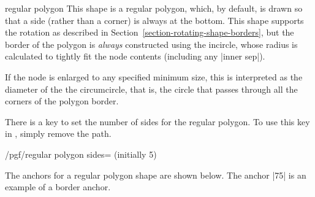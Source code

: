 \begin{shape}{regular polygon}
  This shape is a regular polygon, which, by default, is drawn so that 
  a side (rather than a corner) is always at the bottom. 
  This shape supports the rotation as described in 
  Section~\ref{section-rotating-shape-borders}, but the border of the 
  polygon is \emph{always} constructed using the incircle, whose
  radius is calculated to tightly fit the node contents (including
  any |inner sep|).
  
\begin{codeexample}[]
\end{codeexample}	
	
  If the node is enlarged to any specified minimum size, 
  this is interpreted as the diameter of the the 
  circumcircle, that is, the circle that passes through all the 
  corners of the polygon border.

\begin{codeexample}[]
\end{codeexample}	

  There is a \pgfname{} key to set the number of sides for the regular
  polygon.
  To use this key in \tikzname, simply remove the  path.
	
  \begin{key}{/pgf/regular polygon sides= (initially 5)}
  \end{key}
  
  The anchors for a regular polygon shape are shown below.  
  The anchor |75| is an example of a border anchor.
  
\begin{codeexample}[]
\Huge
{}
\end{codeexample}

\end{shape}

